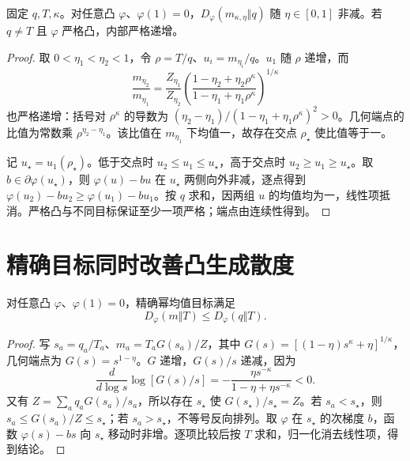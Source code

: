\begin{proposition}[目标到锚点的半径]
固定 $q,T,\kappa$。对任意凸 $\varphi$、$\varphi(1)=0$，$D_\varphi(m_{\kappa,\eta}\Vert q)$ 随 $\eta\in[0,1]$ 非减。若 $q\ne T$ 且 $\varphi$ 严格凸，内部严格递增。
\end{proposition}
\begin{proof}
取 $0<\eta_1<\eta_2<1$，令 $\rho=T/q$、$u_i=m_{\eta_i}/q$。$u_1$ 随 $\rho$ 递增，而
\begin{equation}
\frac{m_{\eta_2}}{m_{\eta_1}}
=\frac{Z_{\eta_1}}{Z_{\eta_2}}
\left(\frac{1-\eta_2+\eta_2\rho^\kappa}
{1-\eta_1+\eta_1\rho^\kappa}\right)^{1/\kappa}
\end{equation}
也严格递增：括号对 $\rho^\kappa$ 的导数为 $(\eta_2-\eta_1)/(1-\eta_1+\eta_1\rho^\kappa)^2>0$。几何端点的比值为常数乘 $\rho^{\eta_2-\eta_1}$。该比值在 $m_{\eta_1}$ 下均值一，故存在交点 $\rho_\star$ 使比值等于一。

记 $u_\star=u_1(\rho_\star)$。低于交点时 $u_2\le u_1\le u_\star$，高于交点时 $u_2\ge u_1\ge u_\star$。取 $b\in\partial\varphi(u_\star)$，则 $\varphi(u)-bu$ 在 $u_\star$ 两侧向外非减，逐点得到 $\varphi(u_2)-bu_2\ge\varphi(u_1)-bu_1$。按 $q$ 求和，因两组 $u$ 的均值均为一，线性项抵消。严格凸与不同目标保证至少一项严格；端点由连续性得到。
\end{proof}

\section{精确目标同时改善凸生成散度}
\begin{theorem}[共同交点的散度进展]
对任意凸 $\varphi$、$\varphi(1)=0$，精确幂均值目标满足
\begin{equation}
D_\varphi(m\Vert T)\le D_\varphi(q\Vert T).
\end{equation}
\end{theorem}
\begin{proof}
写 $s_a=q_a/T_a$、$m_a=T_aG(s_a)/Z$，其中 $G(s)=[(1-\eta)s^\kappa+\eta]^{1/\kappa}$，几何端点为 $G(s)=s^{1-\eta}$。$G$ 递增，$G(s)/s$ 递减，因为
\begin{equation}
\frac d{d\log s}\log[G(s)/s]
=-\frac{\eta s^{-\kappa}}{1-\eta+\eta s^{-\kappa}}<0.
\end{equation}
又有 $Z=\sum_aq_aG(s_a)/s_a$，所以存在 $s_\star$ 使 $G(s_\star)/s_\star=Z$。若 $s_a<s_\star$，则 $s_a\le G(s_a)/Z\le s_\star$；若 $s_a>s_\star$，不等号反向排列。取 $\varphi$ 在 $s_\star$ 的次梯度 $b$，函数 $\varphi(s)-bs$ 向 $s_\star$ 移动时非增。逐项比较后按 $T$ 求和，归一化消去线性项，得到结论。
\end{proof}

